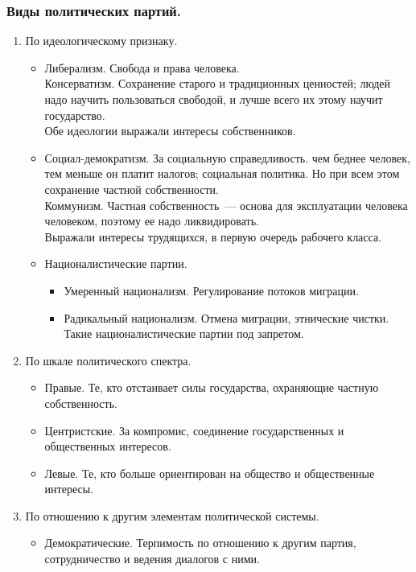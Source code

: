 \documentclass[12pt]{article}
\begin{document}
	\subsubsection{Виды политических партий.}
	\begin{enumerate}
		\item По идеологическому признаку.
		\begin{itemize}
			\item Либерализм. Свобода и права человека. \\
			Консерватизм. Сохранение старого и традиционных ценностей; людей надо научить пользоваться свободой, и лучше всего их этому научит государство. \\
			Обе идеологии выражали интересы собственников.
			\item Социал-демократизм. За социальную справедливость. чем беднее человек, тем меньше он платит налогов; социальная политика. Но при всем этом сохранение частной собственности. \\
			Коммунизм. Частная собственность~--- основа для эксплуатации человека человеком, поэтому ее надо ликвидировать. \\
			Выражали интересы трудящихся, в первую очередь рабочего класса.
			\item Националистические партии.
			\begin{itemize}
				\item Умеренный национализм. Регулирование потоков миграции.
				\item Радикальный национализм. Отмена миграции, этнические чистки. Такие националистические партии под запретом.
			\end{itemize}
		\end{itemize}
		\item По шкале политического спектра.
		\begin{itemize}
			\item Правые. Те, кто отстаивает силы государства, охраняющие частную собственность.
			\item Центристские. За компромис, соединение государственных и общественных интересов.
			\item Левые. Те, кто больше ориентирован на общество и общественные интересы.
		\end{itemize}
		\item По отношению к другим элементам политической системы.
		\begin{itemize}
			\item Демократические. Терпимость по отношению к другим партия, сотрудничество и ведения диалогов с ними.

\end{itemize}
\end{enumerate}
\end{document}
